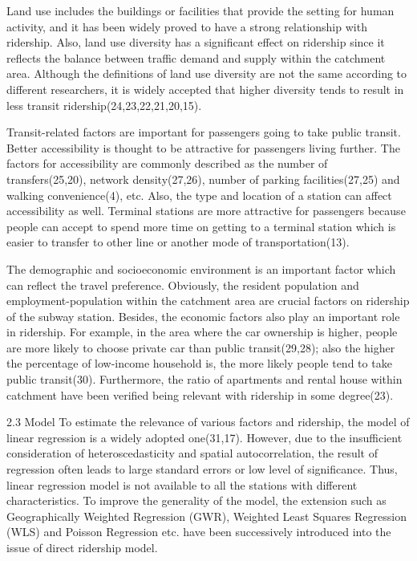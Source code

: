 Land use includes the buildings or facilities that provide the setting for human activity, and it has been widely proved to have a strong relationship with ridership. Also, land use diversity has a significant effect on ridership since it reflects the balance between traffic demand and supply within the catchment area. Although the definitions of land use diversity are not the same according to different researchers, it is widely accepted that higher diversity tends to result in less transit ridership(24,23,22,21,20,15).

Transit-related factors are important for passengers going to take public transit. Better accessibility is thought to be attractive for passengers living further. The factors for accessibility are commonly described as the number of transfers(25,20), network density(27,26), number of parking facilities(27,25) and walking convenience(4), etc. Also, the type and location of a station can affect accessibility as well. Terminal stations are more attractive for passengers because people can accept to spend more time on getting to a terminal station which is easier to transfer to other line or another mode of transportation(13).

The demographic and socioeconomic environment is an important factor which can reflect the travel preference. Obviously, the resident population and employment-population within the catchment area are crucial factors on ridership of the subway station. Besides, the economic factors also play an important role in ridership. For example, in the area where the car ownership is higher, people are more likely to choose private car than public transit(29,28); also the higher the percentage of low-income household is, the more likely people tend to take public transit(30). Furthermore, the ratio of apartments and rental house within catchment have been verified being relevant with ridership in some degree(23).

2.3 Model
To estimate the relevance of various factors and ridership, the model of linear regression is a widely adopted one(31,17). However, due to the insufficient consideration of heteroscedasticity and spatial autocorrelation, the result of regression often leads to large standard errors or low level of significance. Thus, linear regression model is not available to all the stations with different characteristics. To improve the generality of the model, the extension such as Geographically Weighted Regression (GWR), Weighted Least Squares Regression (WLS) and Poisson Regression etc. have been successively introduced into the issue of direct ridership model.

